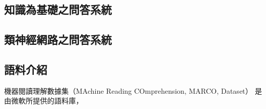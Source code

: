 \subsection{}
\subsection{知識為基礎之問答系統}

\subsection{類神經網路之問答系統}

\subsection{語料介紹}
機器閱讀理解數據集（MAchine Reading COmprehension, MARCO, Dataset）\cite{nguyen2016ms} 是由微軟所提供的語料庫，
